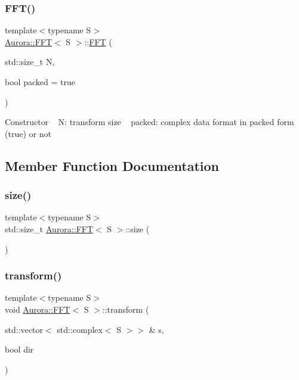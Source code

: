 \subsubsection{\texorpdfstring{F\+F\+T()}{FFT()}}
{\footnotesize\ttfamily template$<$typename S$>$ \\
\hyperlink{class_aurora_1_1_f_f_t}{Aurora\+::\+F\+FT}$<$ S $>$\+::\hyperlink{class_aurora_1_1_f_f_t}{F\+FT} (\begin{DoxyParamCaption}\item[{std\+::size\+\_\+t}]{N,  }\item[{bool}]{packed = {\ttfamily true} }\end{DoxyParamCaption})\hspace{0.3cm}{\ttfamily [inline]}}

Constructor ~\newline
N\+: transform size ~\newline
packed\+: complex data format in packed form (true) or not 

\subsection{Member Function Documentation}
\mbox{\label{class_aurora_1_1_f_f_t_ad0149c60672d3f4e64850dde22f5b163}} 
\subsubsection{\texorpdfstring{size()}{size()}}
{\footnotesize\ttfamily template$<$typename S$>$ \\
std\+::size\+\_\+t \hyperlink{class_aurora_1_1_f_f_t}{Aurora\+::\+F\+FT}$<$ S $>$\+::size (\begin{DoxyParamCaption}{ }\end{DoxyParamCaption})\hspace{0.3cm}{\ttfamily [inline]}}

\mbox{\label{class_aurora_1_1_f_f_t_a8325de64c8b9f208ed0bc8db3f74e4c7}} 
\subsubsection{\texorpdfstring{transform()}{transform()}\hspace{0.1cm}{\footnotesize\ttfamily [1/3]}}
{\footnotesize\ttfamily template$<$typename S$>$ \\
void \hyperlink{class_aurora_1_1_f_f_t}{Aurora\+::\+F\+FT}$<$ S $>$\+::transform (\begin{DoxyParamCaption}\item[{std\+::vector$<$ std\+::complex$<$ S $>$$>$ \&}]{s,  }\item[{bool}]{dir }\end{DoxyParamCaption})\hspace{0.3cm}{\ttfamily [inline]}}

